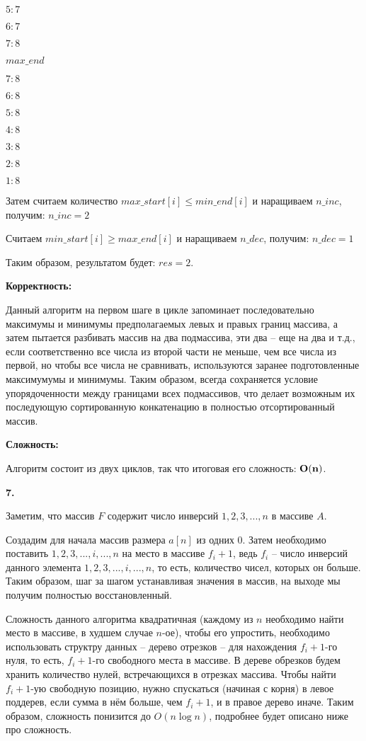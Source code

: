 \documentclass[12pt]{extreport}
\begin{document}
$5: 7$

$6: 7$

$7: 8$

\bigskip

$max\_end$

$7: 8$ 

$6: 8$ 

$5: 8$ 

$4: 8$

$3: 8$

$2: 8$

$1: 8$

Затем считаем количество $max\_start[i] \leq min\_end[i]$ и наращиваем $n\_inc$, получим: $n\_inc =2 $

Считаем $min\_start[i] \geq max\_end[i]$ и наращиваем $n\_dec$, получим: $n\_dec = 1$

Таким образом, результатом будет: $res = 2$.

\bigskip 
{\bf Корректность:}

Данный алгоритм на первом шаге в цикле запоминает последовательно максимумы и минимумы предполагаемых левых и правых границ массива, а затем пытается разбивать массив на два подмассива, эти два --  еще на два и т.д., если соответственно все числа из второй части не меньше, чем все числа из первой, но чтобы все числа не сравнивать, используются заранее подготовленные максимумумы и минимумы. Таким образом, всегда сохраняется условие упорядоченности между границами всех подмассивов, что делает возможным их последующую сортированную конкатенацию в полностью отсортированный массив. 

\bigskip 
{\bf Сложность:} 

Алгоритм состоит из двух циклов, так что итоговая его сложность: $\bf{O(n)}$.

\bigskip 

{\bf 7.} 

Заметим, что массив $F$ содержит число инверсий $1, 2, 3, ..., n$ в массиве $A$.

Создадим для начала массив размера $a[n]$ из одних 0. Затем необходимо поставить $1, 2, 3, ...,i, ..., n$ на место в массиве $f_i + 1$, ведь $f_i$ -- число инверсий данного элемента $1, 2, 3, ...,i, ..., n$, то есть, количество чисел, которых он больше. Таким образом, шаг за шагом устанавливая значения в массив, на выходе мы получим полностью восстановленный. 

Сложность данного алгоритма квадратичная (каждому из $n$ необходимо найти место в массиве, в худшем случае $n$-ое), чтобы его упростить, необходимо использовать структру данных -- дерево отрезков -- для нахождения $f_i + 1$-го нуля, то есть, $f_i + 1$-го свободного места в массиве. В дереве обрезков будем хранить количество нулей, встречающихся в отрезках массива. Чтобы найти $f_i + 1$-ую свободную позицию, нужно спускаться (начиная с корня) в левое поддерев, если сумма в нём больше, чем $f_i +1 $, и в правое дерево иначе. Таким образом, сложность понизится до $O(n \log n)$, подробнее будет описано ниже про сложность. 
\end{document}
